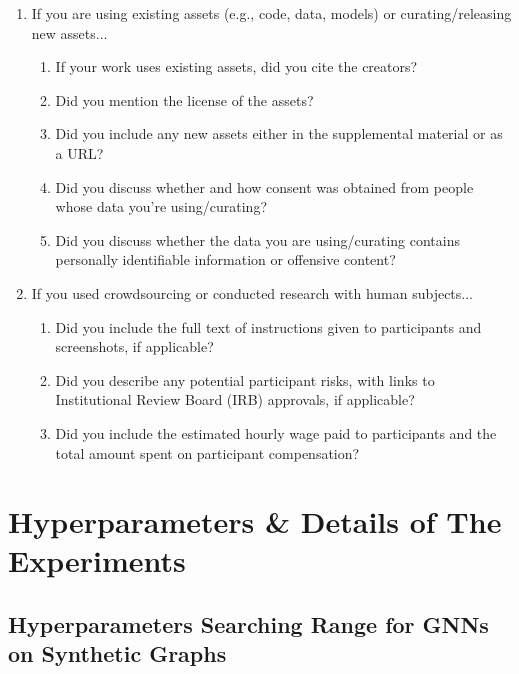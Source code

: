 \documentclass{article}
\newcommand{\0}{{\boldsymbol{0}}}
\newcommand{\6}{{\partial}}
\newcommand{\8}{{\infty}}
\newcommand{\4}{{\nabla}}
\begin{document}
\begin{enumerate}
\item If you are using existing assets (e.g., code, data, models) or curating/releasing new assets...
\begin{enumerate}
  \item If your work uses existing assets, did you cite the creators?
  \item Did you mention the license of the assets?
    \answerNo{}
  \item Did you include any new assets either in the supplemental material or as a URL?
    \answerNo{}
  \item Did you discuss whether and how consent was obtained from people whose data you're using/curating?
    \answerNo{}
  \item Did you discuss whether the data you are using/curating contains personally identifiable information or offensive content?
\end{enumerate}

\item If you used crowdsourcing or conducted research with human subjects...
\begin{enumerate}
  \item Did you include the full text of instructions given to participants and screenshots, if applicable?
  \item Did you describe any potential participant risks, with links to Institutional Review Board (IRB) approvals, if applicable?
  \item Did you include the estimated hourly wage paid to participants and the total amount spent on participant compensation?
\end{enumerate}

\end{enumerate}




\clearpage
\appendix
\section{Hyperparameters \& Details of The Experiments}
\label{appendix:hyperparameter}


\subsection{Hyperparameters Searching Range for GNNs on Synthetic Graphs}
\label{appendix:hyperparameter_space_synthetic_graphs}
\end{document}
